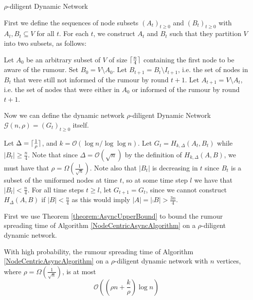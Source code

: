 \begin{definition}
	$\rho$-diligent Dynamic Network
	
	First we define the sequences of node subsets $(A_t)_{t\geq 0}$ and $(B_t)_{t\geq0}$ with $A_t, B_t \subseteq V$ for all $t$. For each $t$, we construct $A_t$ and $B_t$ such that they partition $V$ into two subsets, as follows:

	Let $A_0$ be an arbitrary subset of $V$ of size $\lceil\frac{n}{4}\rceil$ containing the first node to be aware of the rumour. %
	Set $B_0 = V \setminus A_0$. Let $B_{t+1} = B_t \setminus I_{t+1}$, i.e. the set of nodes in $B_t$ that were still not informed of the rumour by round $t+1$. %
	Let $A_{t+1} = V \setminus A_t$, i.e. the set of nodes that were either in $A_0$ or informed of the rumour by round $t+1$.

	Now we can define the dynamic network $\rho$-diligent Dynamic Network $\mathcal{G}(n, \rho) = (G_t)_{t\geq 0}$ itself. 

	Let $\Delta = \lceil\frac{1}{\rho}\rceil$, and $k = \mathcal{O}(\log n / \log \log n)$.
	Let $G_t = H_{k, \Delta}(A_t, B_t)$ while $|B_t| \geq \frac{n}{4}$. Note that since $\Delta = \mathcal{O}(\sqrt{n})$ by the definition of $H_{k, \Delta}(A,B)$, we must have that $\rho = \Omega\left(\frac{1}{\sqrt{n}}\right)$.
	Note also that $|B_t|$ is decreasing in $t$ since $B_t$ is a subset of the uniformed nodes at time $t$, so at some time step $l$ we have that $|B_l| < \frac{n}{4}$. For all time steps $t \geq l$, let $G_{t+1} = G_t$, since we cannot construct $H_\Delta(A,B)$ if $|B| < \frac{n}{4}$ as this would imply $|A| = |\comp{B}| > \frac{3n}{4}$. %
\end{definition}

First we use Theorem \ref{theorem:AsyncUpperBound} to bound the rumour spreading time of Algorithm \ref{NodeCentricAsyncAlgorithm} on a $\rho$-diligent dynamic network.

\begin{theorem}
	With high probability, the rumour spreading time of Algorithm \ref{NodeCentricAsyncAlgorithm} on a $\rho$-diligent dynamic network with $n$ vertices, where $\rho = \Omega(\frac{1}{\sqrt{n}})$, is at most 
	$$
		\mathcal{O}\left(\left(\rho n + \frac{k}{\rho}\right)\log n\right)
	$$
\end{theorem}

